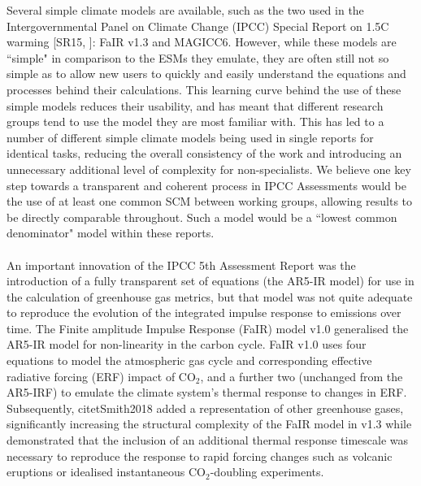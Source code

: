\documentclass[gmd, manuscript]{copernicus}
\begin{document}
Several simple climate models are available, such as the two used in the Intergovernmental Panel on Climate Change (IPCC) Special Report on 1.5\textdegree C warming [SR15, \cite{IPCC2018}]: FaIR v1.3 and MAGICC6. However, while these models are ``simple" in comparison to the ESMs they emulate, they are often still not so simple as to allow new users to quickly and easily understand the equations and processes behind their calculations. This learning curve behind the use of these simple models reduces their usability, and has meant that different research groups tend to use the model they are most familiar with. This has led to a number of different simple climate models being used in single reports for identical tasks, reducing the overall consistency of the work and introducing an unnecessary additional level of complexity for non-specialists. We believe one key step towards a transparent and coherent process in IPCC Assessments would be the use of at least one common SCM between working groups, allowing results to be directly comparable throughout. Such a model would be a ``lowest common denominator" model within these reports.\\\\
An important innovation of the IPCC 5th Assessment Report \citep{Myhre2013a} was the introduction of a fully transparent set of equations (the AR5-IR model) for use in the calculation of greenhouse gas metrics, but that model was not quite adequate to reproduce the evolution of the integrated impulse response to emissions over time. The Finite amplitude Impulse Response (FaIR) model v1.0 \citep{Millar2016} generalised the AR5-IR model for non-linearity in the carbon cycle. FaIR v1.0 uses four equations to model the atmospheric gas cycle and corresponding effective radiative forcing (ERF) impact of CO$_2$, and a further two (unchanged from the AR5-IRF) to emulate the climate system's thermal response to changes in ERF. Subsequently, citet{Smith2018} added a representation of other greenhouse gases, significantly increasing the structural complexity of the FaIR model in v1.3 while \citet{Tsutsui2017} demonstrated that the inclusion of an additional thermal response timescale was necessary to reproduce the response to rapid forcing changes such as volcanic eruptions or idealised instantaneous CO$_2$-doubling experiments.\\\\
\end{document}

